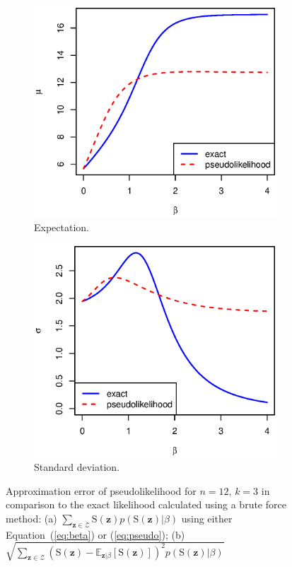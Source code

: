 \documentclass[nojss,shortnames]{jss}\usepackage[]{graphicx}\usepackage[]{color}
\begin{document}
\begin{figure}
        \centering
        \begin{subfigure}{0.65\textwidth}
                \includegraphics[width=\textwidth]{pl_exp_n12k3.eps}
                \caption{Expectation.}
                \label{f:pl_exp}
        \end{subfigure}%
\qquad
        \begin{subfigure}{0.65\textwidth}
                \includegraphics[width=\textwidth]{pl_sd_n12k3.eps}
                \caption{Standard deviation.}
                \label{f:pl_sd}
        \end{subfigure}%
\caption{Approximation error of pseudolikelihood for $n=12,\,k=3$ in comparison to the exact likelihood calculated using a brute force method: (a) $\sum_{\mathbf{z} \in \mathcal{Z}} \mathrm{S}(\mathbf{z}) p(\mathrm{S}(\mathbf{z}) | \beta)$ using either Equation~(\ref{eq:beta}) or (\ref{eq:pseudo}); (b) $\sqrt{\sum_{\mathbf{z} \in \mathcal{Z}} \left( \mathrm{S}(\mathbf{z}) - \mathbb{E}_{\mathbf{z}|\beta}[\mathrm{S}(\mathbf{z})] \right)^2 p(\mathrm{S}(\mathbf{z}) | \beta)}$} 
\label{f:pl}
\end{figure}
\end{document}
